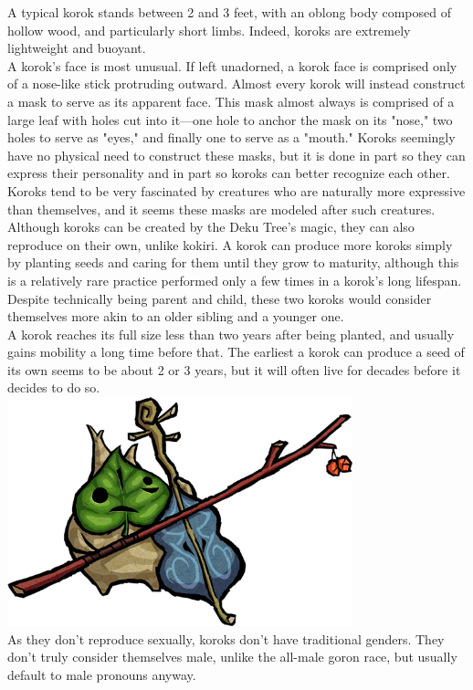 \documentclass[10pt,twoside,twocolumn,openany]{book}
\begin{document}
A typical korok stands between 2 and 3 feet, with an oblong body composed of hollow wood, and particularly short limbs. Indeed, koroks are extremely lightweight and buoyant.\\
A korok's face is most unusual. If left unadorned, a korok face is comprised only of a nose-like stick protruding outward. Almost every korok will instead construct a mask to serve as its apparent face. This mask almost always is comprised of a large leaf with holes cut into it—one hole to anchor the mask on its "nose," two holes to serve as "eyes," and finally one to serve as a "mouth." Koroks seemingly have no physical need to construct these masks, but it is done in part so they can express their personality and in part so koroks can better recognize each other. Koroks tend to be very fascinated by creatures who are naturally more expressive than themselves, and it seems these masks are modeled after such creatures.\\
Although koroks can be created by the Deku Tree's magic, they can also reproduce on their own, unlike kokiri. A korok can produce more koroks simply by planting seeds and caring for them until they grow to maturity, although this is a relatively rare practice performed only a few times in a korok's long lifespan. Despite technically being parent and child, these two koroks would consider themselves more akin to an older sibling and a younger one.\\
A korok reaches its full size less than two years after being planted, and usually gains mobility a long time before that. The earliest a korok can produce a seed of its own seems to be about 2 or 3 years, but it will often live for decades before it decides to do so.\\
\includegraphics[width=100mm,scale=0.5]{img/makar.png} \\
As they don't reproduce sexually, koroks don't have traditional genders. They don't truly consider themselves male, unlike the all-male goron race, but usually default to male pronouns anyway.
\end{document}
